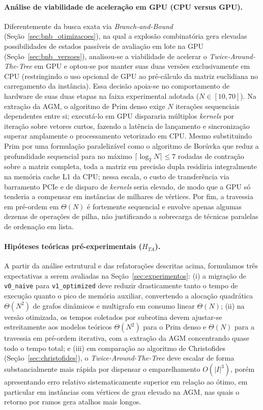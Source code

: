 \paragraph{Análise de viabilidade de aceleração em GPU (CPU versus GPU).}
Diferentemente da busca exata via \textit{Branch-and-Bound} (Seção~\ref{sec:bnb_otimizacoes}), na qual a explosão combinatória gera elevadas possibilidades de estados passíveis de
avaliação em lote na GPU (Seção~\ref{sec:bnb_versoes}), analisou-se a viabilidade de
acelerar o \textit{Twice-Around-The-Tree} em GPU e optou-se por manter suas duas versões
exclusivamente em CPU (restringindo o uso opcional de GPU ao pré-cálculo da matriz euclidiana
no carregamento da instância). Essa decisão apoia-se no comportamento de hardware de suas duas
etapas na faixa experimental adotada ($N \in [10, 70]$). Na extração da AGM, o algoritmo de
Prim denso exige $N$ iterações sequenciais dependentes entre si; executá-lo em GPU dispararia
múltiplos \textit{kernels} por iteração sobre vetores curtos, fazendo a latência de lançamento e sincronização superar amplamente o
processamento vetorizado em CPU. Mesmo substituindo Prim por uma formulação paralelizável como o algoritmo de Bor\r{u}vka que reduz a profundidade sequencial para no
máximo $\lceil \log_2 N \rceil \le 7$ rodadas de contração sobre a matriz completa, toda a
matriz em precisão dupla residiria integralmente na
memória cache L1 da CPU; nessa escala, o custo de transferência via barramento PCIe e de
disparo de \textit{kernels} seria elevado, de modo que a GPU só tenderia a compensar em
instâncias de milhares de vértices. Por fim, a travessia em pré-ordem em $\Theta(N)$ é
fortemente sequencial e envolve apenas algumas dezenas de operações de pilha, não
justificando a sobrecarga de técnicas paralelas de ordenação em lista.

\paragraph{Hipóteses teóricas pré-experimentais ($H_{TA}$).}
A partir da análise estrutural e das refatorações descritas acima, formulamos três expectativas
a serem avaliadas na Seção~\ref{sec:experimentos}: (i) a migração de \texttt{v0\_naive} para
\texttt{v1\_optimized} deve reduzir drasticamente tanto o tempo de execução quanto o pico de
memória auxiliar, convertendo a alocação quadrática $\Theta(N^2)$ de grafos dinâmicos e
multigrafo em consumo linear $\Theta(N)$; (ii) na versão otimizada, os tempos coletados por
subrotina devem ajustar-se estreitamente aos modelos teóricos $\Theta(N^2)$ para o Prim denso e
$\Theta(N)$ para a travessia em pré-ordem iterativa, com a extração da AGM concentrando quase
todo o tempo total; e (iii) em comparação ao algoritmo de Christofides
(Seção~\ref{sec:christofides}), o \textit{Twice-Around-The-Tree} deve escalar de forma
substancialmente mais rápida por dispensar o emparelhamento $O(|I|^3)$, porém apresentando erro
relativo sistematicamente superior em relação ao ótimo, em particular em instâncias com
vértices de grau elevado na AGM, nas quais o retorno por ramos gera atalhos mais longos.

